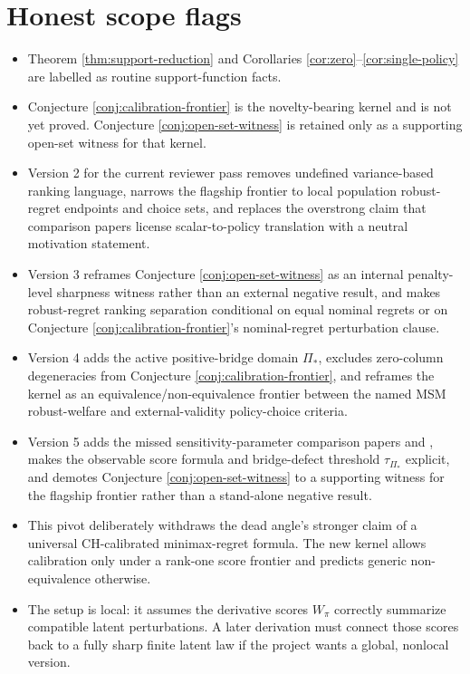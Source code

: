 \documentclass[11pt]{article}
\theoremstyle{definition}
\theoremstyle{plain}
\theoremstyle{remark}
\begin{document}
\section{Honest scope flags}
\begin{itemize}[leftmargin=*]
\item Theorem \ref{thm:support-reduction} and Corollaries \ref{cor:zero}--\ref{cor:single-policy} are labelled as routine support-function facts.
\item Conjecture \ref{conj:calibration-frontier} is the novelty-bearing kernel and is not yet proved.  Conjecture \ref{conj:open-set-witness} is retained only as a supporting open-set witness for that kernel.
\item Version 2 for the current reviewer pass removes undefined variance-based ranking language, narrows the flagship frontier to local population robust-regret endpoints and choice sets, and replaces the overstrong claim that comparison papers license scalar-to-policy translation with a neutral motivation statement.
\item Version 3 reframes Conjecture \ref{conj:open-set-witness} as an internal penalty-level sharpness witness rather than an external negative result, and makes robust-regret ranking separation conditional on equal nominal regrets or on Conjecture \ref{conj:calibration-frontier}'s nominal-regret perturbation clause.
\item Version 4 adds the active positive-bridge domain $\Pi_\ast$, excludes zero-column degeneracies from Conjecture \ref{conj:calibration-frontier}, and reframes the kernel as an equivalence/non-equivalence frontier between the named MSM robust-welfare and external-validity policy-choice criteria.
\item Version 5 adds the missed sensitivity-parameter comparison papers \citet{DiegertMastenPoirier2025} and \citet{MastenPoirierRen2025}, makes the observable score formula and bridge-defect threshold $\tau_{\Pi_\ast}$ explicit, and demotes Conjecture \ref{conj:open-set-witness} to a supporting witness for the flagship frontier rather than a stand-alone negative result.
\item This pivot deliberately withdraws the dead angle's stronger claim of a universal CH-calibrated minimax-regret formula.  The new kernel allows calibration only under a rank-one score frontier and predicts generic non-equivalence otherwise.
\item The setup is local: it assumes the derivative scores $W_{\pi}$ correctly summarize compatible latent perturbations.  A later derivation must connect those scores back to a fully sharp finite latent law if the project wants a global, nonlocal version.
\end{itemize}
\end{document}
